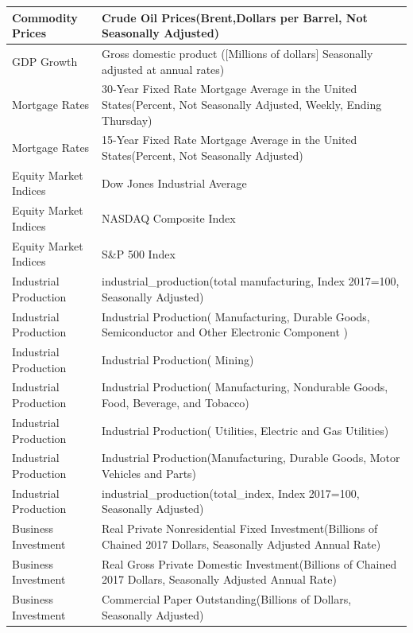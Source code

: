 \begin{center}
\begin{singlespace}
\begin{scriptsize}
\begin{longtable}{p{}|p{}}
        \hline
        Commodity Prices  & Crude Oil Prices(Brent,Dollars per Barrel, Not Seasonally Adjusted) \\
        \hline
        GDP Growth  & Gross domestic product ([Millions of dollars] Seasonally adjusted at annual rates) \\
        \hline
        Mortgage Rates  & 30-Year Fixed Rate Mortgage Average in the United States(Percent, Not Seasonally Adjusted, Weekly, Ending Thursday) \\
        \hline
        Mortgage Rates  & 15-Year Fixed Rate Mortgage Average in the United States(Percent, Not Seasonally Adjusted) \\
        \hline
        Equity Market Indices  & Dow Jones Industrial Average \\
        \hline
        Equity Market Indices  & NASDAQ Composite Index \\
        \hline
        Equity Market Indices  & S\&P 500 Index \\
        \hline
        Industrial Production  & industrial\_production(total manufacturing, Index 2017=100, Seasonally Adjusted) \\
        \hline
        Industrial Production  & Industrial Production( Manufacturing, Durable Goods, Semiconductor and Other Electronic Component ) \\
        \hline
        Industrial Production  & Industrial Production( Mining) \\
        \hline
        Industrial Production  & Industrial Production( Manufacturing, Nondurable Goods, Food, Beverage, and Tobacco) \\
        \hline
        Industrial Production  & Industrial Production( Utilities, Electric and Gas Utilities) \\
        \hline
        Industrial Production  & Industrial Production(Manufacturing, Durable Goods,  Motor Vehicles and Parts) \\
        \hline
        Industrial Production  & industrial\_production(total\_index, Index 2017=100, Seasonally Adjusted) \\
        \hline
        Business Investment  & Real Private Nonresidential Fixed Investment(Billions of Chained 2017 Dollars, Seasonally Adjusted Annual Rate) \\
        \hline
        Business Investment  & Real Gross Private Domestic Investment(Billions of Chained 2017 Dollars, Seasonally Adjusted Annual Rate) \\
        \hline
        Business Investment  & Commercial Paper Outstanding(Billions of Dollars, Seasonally Adjusted) \\

\end{longtable}
\end{scriptsize}
\end{singlespace}
\end{center}
